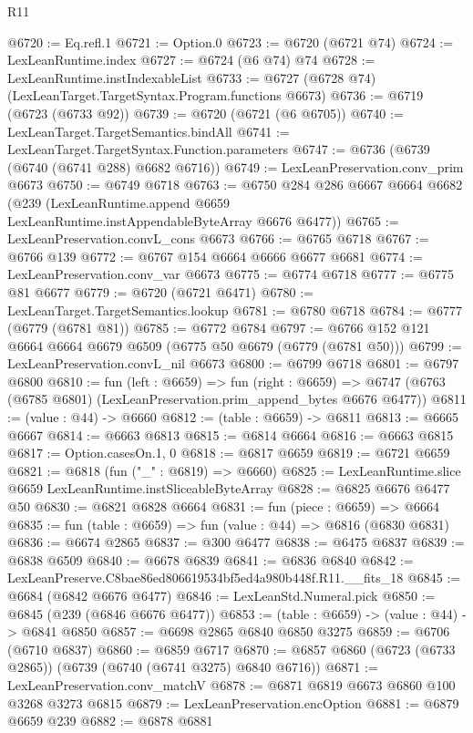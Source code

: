 \begin{lexlean}{R11}
\begin{coremodule}
@6720 := Eq.refl.{1}
@6721 := Option.{0}
@6723 := @6720 (@6721 @74)
@6724 := LexLeanRuntime.index
@6727 := @6724 (@6 @74) @74
@6728 := LexLeanRuntime.instIndexableList
@6733 := @6727 (@6728 @74) (LexLeanTarget.TargetSyntax.Program.functions @6673)
@6736 := @6719 (@6723 (@6733 @92))
@6739 := @6720 (@6721 (@6 @6705))
@6740 := LexLeanTarget.TargetSemantics.bindAll
@6741 := LexLeanTarget.TargetSyntax.Function.parameters
@6747 := @6736 (@6739 (@6740 (@6741 @288) @6682 @6716))
@6749 := LexLeanPreservation.conv_prim @6673
@6750 := @6749 @6718
@6763 := @6750
    @284
    @286
    @6667
    @6664
    @6682
    (@239 (LexLeanRuntime.append @6659 LexLeanRuntime.instAppendableByteArray @6676 @6477))
@6765 := LexLeanPreservation.convL_cons @6673
@6766 := @6765 @6718
@6767 := @6766 @139
@6772 := @6767 @154 @6664 @6666 @6677 @6681
@6774 := LexLeanPreservation.conv_var @6673
@6775 := @6774 @6718
@6777 := @6775 @81 @6677
@6779 := @6720 (@6721 @6471)
@6780 := LexLeanTarget.TargetSemantics.lookup
@6781 := @6780 @6718
@6784 := @6777 (@6779 (@6781 @81))
@6785 := @6772 @6784
@6797 := @6766 @152 @121 @6664 @6664 @6679 @6509 (@6775 @50 @6679 (@6779 (@6781 @50)))
@6799 := LexLeanPreservation.convL_nil @6673
@6800 := @6799 @6718
@6801 := @6797 @6800
@6810 := fun (left : @6659) =>
  fun (right : @6659) =>
  @6747 (@6763 (@6785 @6801) (LexLeanPreservation.prim_append_bytes @6676 @6477))
@6811 := (value : @44) -> @6660
@6812 := (table : @6659) -> @6811
@6813 := @6665 @6667
@6814 := @6663 @6813
@6815 := @6814 @6664
@6816 := @6663 @6815
@6817 := Option.casesOn.{1, 0}
@6818 := @6817 @6659
@6819 := @6721 @6659
@6821 := @6818 (fun ("_" : @6819) => @6660)
@6825 := LexLeanRuntime.slice @6659 LexLeanRuntime.instSliceableByteArray
@6828 := @6825 @6676 @6477 @50
@6830 := @6821 @6828 @6664
@6831 := fun (piece : @6659) => @6664
@6835 := fun (table : @6659) => fun (value : @44) => @6816 (@6830 @6831)
@6836 := @6674 @2865
@6837 := @300 @6477
@6838 := @6475 @6837
@6839 := @6838 @6509
@6840 := @6678 @6839
@6841 := @6836 @6840
@6842 := LexLeanPreserve.C8bae86ed806619534bf5ed4a980b448f.R11.__fits_18
@6845 := @6684 (@6842 @6676 @6477)
@6846 := LexLeanStd.Numeral.pick
@6850 := @6845 (@239 (@6846 @6676 @6477))
@6853 := (table : @6659) -> (value : @44) -> @6841 @6850
@6857 := @6698 @2865 @6840 @6850 @3275
@6859 := @6706 (@6710 @6837)
@6860 := @6859 @6717
@6870 := @6857 @6860 (@6723 (@6733 @2865)) (@6739 (@6740 (@6741 @3275) @6840 @6716))
@6871 := LexLeanPreservation.conv_matchV
@6878 := @6871 @6819 @6673 @6860 @100 @3268 @3273 @6815
@6879 := LexLeanPreservation.encOption
@6881 := @6879 @6659 @239
@6882 := @6878 @6881

\end{coremodule}
\end{lexlean}
